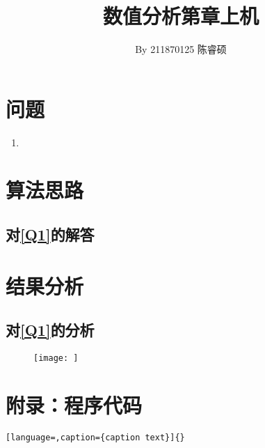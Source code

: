 \documentclass[a4paper,11pt,notitlepage]{article}
\title{\vspace{-1.5cm} \textbf{\huge{数值分析第章上机}}\vspace{-1em}}
\author{By 211870125 陈睿硕}
\date{}
\begin{document}
\maketitle
\vspace{-1cm}
\thispagestyle{fancy}

\section{问题}
\begin{adjustwidth}{1em}{0pt}
\begin{enumerate}[label=\textbf{Q\arabic*}]
    \item 
\end{enumerate}
\end{adjustwidth}

\section{算法思路}
\subsection{对\ref{Q1}的解答}

\section{结果分析}
\subsection{对\ref{Q1}的分析}

\begin{figure}[H]
    \centering
    \texttt{[image: ]}
    \caption{}
    \label{}
\end{figure}

\subsubsection{}
\begin{adjustwidth}{1em}{0pt}
\qquad
\end{adjustwidth}

\section{附录：程序代码}
\begin{lstlisting}[language=,caption={caption text}]{}

\end{lstlisting}
\end{document}
